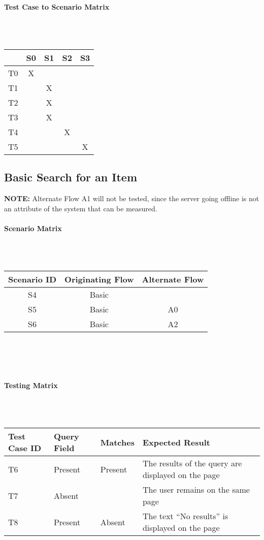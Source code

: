 \documentclass{article}
\begin{document}
\paragraph{Test Case to Scenario Matrix}~\\ \\
\begin{tabular}{ | c || c | c | c | c | }
\hline
   & S0 & S1 & S2 & S3 \\
\hline
\hline
T0 & X  &    &    &    \\
\hline
T1 &    & X  &    &    \\
\hline
T2 &    & X  &    &    \\
\hline
T3 &    & X  &    &    \\
\hline
T4 &    &    & X  &    \\
\hline
T5 &    &    &    & X  \\
\hline
\end{tabular}

\subsection{Basic Search for an Item}
\textbf{NOTE:} Alternate Flow A1 will not be tested, since the server going offline is not an attribute of the system that can be measured.

\paragraph{Scenario Matrix}~\\ \\
\begin{tabular}{ c  c  c }
\hline
Scenario ID & Originating Flow & Alternate Flow\\
\hline
\hline
S4 & Basic &  \\
\hline
S5 & Basic & A0 \\
\hline
S6 & Basic & A2 \\
\hline
\end{tabular}\\
~\\
~\\
\paragraph{Testing Matrix}~\\ \\
\begin{tabular}{ p{0.8in}  p{0.75in}  p{0.5in}  p{3in} }
\hline
Test Case ID & Query Field & Matches & Expected Result\\
\hline
\hline
T6 & Present & Present & The results of the query are displayed on the page\\
\hline
T7 & Absent & & The user remains on the same page\\
\hline
T8 & Present & Absent & The text ``No results'' is displayed on the page\\
\hline
\end{tabular}\\
~\\
~\\
\end{document}

